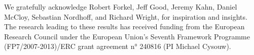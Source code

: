 \begin{refsection}

We gratefully acknowledge Robert Forkel, Jeff Good, Jeremy Kahn, Daniel McCloy, Sebastian Nordhoff, and Richard Wright, for inspiration and insights. The research leading to these results has received funding from the European Research Council under the European Union's Seventh Framework Programme (FP7/2007-2013)/ERC grant agreement n° 240816 (PI Michael Cysouw).

\printbibliography[heading=subbibliography]
\end{refsection}

